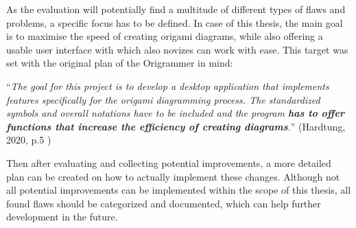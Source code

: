 As the evaluation will potentially find a multitude of different types of flaws and problems, a specific focus has to be defined. In case of this thesis, the main goal is to maximise the speed of creating origami diagrams, while also offering a usable user interface with which also novizes can work with ease. This target was set with the original plan of the Origrammer in mind:

\begin{center}
\enquote{\emph{The goal for this project is to develop a desktop application that implements features specifically for the origami diagramming process. The standardized symbols and overall notations have to be included and the program \textbf{has to offer functions that increase the efficiency of creating diagrams}.}} (Hardtung, 2020, p.5 \cite{origrammer})
\end{center}

\noindent Then after evaluating and collecting potential improvements, a more detailed plan can be created on how to actually implement these changes. Although not all potential improvements can be implemented within the scope of this thesis, all found flaws should be categorized and documented, which can help further development in the future.